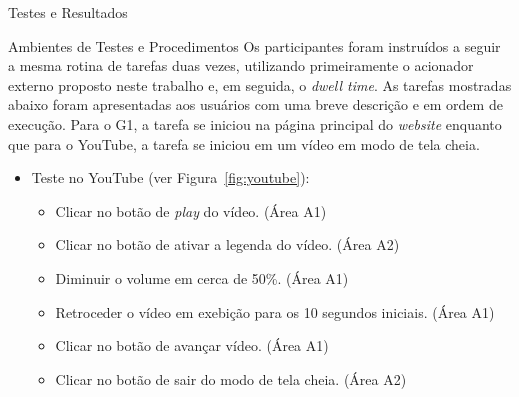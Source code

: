 \begin{chapter}{Testes e Resultados}
\begin{section}{Ambientes de Testes e Procedimentos}
Os participantes foram instruídos a seguir a mesma rotina de tarefas duas vezes,
utilizando primeiramente o acionador externo proposto neste trabalho e, em
seguida, o \textit{dwell time}. As tarefas mostradas abaixo foram
apresentadas aos usuários com uma breve descrição e em ordem de execução.
Para o G1, a tarefa se iniciou na página principal do \textit{website} enquanto
que para o YouTube, a tarefa se iniciou em um vídeo em modo de tela cheia.  

\begin{itemize}
\item Teste no YouTube (ver Figura~\ref{fig:youtube}):
	\begin{itemize}
	\renewcommand\labelitemi{--}
	\item Clicar no botão de \textit{play} do vídeo.                   \hfill(Área A1)
	\item Clicar no botão de ativar a legenda do vídeo.                \hfill(Área A2)
	\item Diminuir o volume em cerca de 50\%.                          \hfill(Área A1)
	\item Retroceder o vídeo em exebição para os 10 segundos iniciais. \hfill(Área A1)
	\item Clicar no botão de avançar vídeo.                            \hfill(Área A1)
	\item Clicar no botão de sair do modo de tela cheia.               \hfill(Área A2)
	\end{itemize}


\end{itemize}
\end{section}
\end{chapter}
